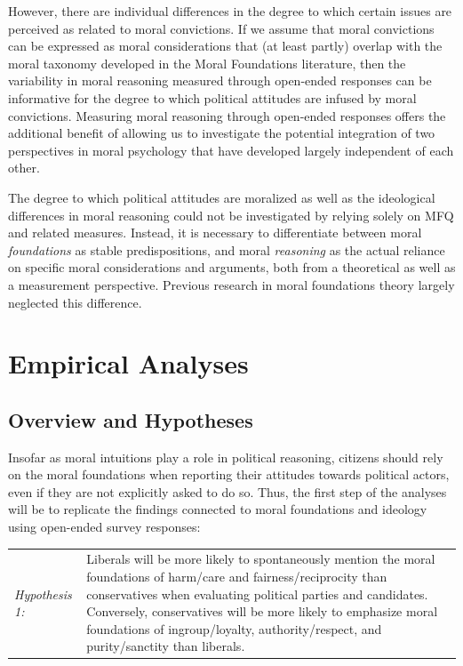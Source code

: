 \documentclass[12pt]{article}
\begin{document}
However, there are individual differences in the degree to which certain issues are perceived as related to moral convictions. If we assume that moral convictions can be expressed as moral considerations that (at least partly) overlap with the moral taxonomy developed in the Moral Foundations literature, then the variability in moral reasoning measured through open-ended responses can be informative for the degree to which political attitudes are infused by moral convictions. Measuring moral reasoning through open-ended responses offers the additional benefit of allowing us to investigate the potential integration of two perspectives in moral psychology that have developed largely independent of each other.

The degree to which political attitudes are moralized as well as the ideological differences in moral reasoning could not be investigated by relying solely on MFQ and related measures. Instead, it is necessary to differentiate between moral \textit{foundations} as stable predispositions, and moral \textit{reasoning} as the actual reliance on specific moral considerations and arguments, both from a theoretical as well as a measurement perspective. Previous research in moral foundations theory largely neglected this difference.



\section{Empirical Analyses}

\subsection{Overview and Hypotheses}

Insofar as moral intuitions play a role in political reasoning, citizens should rely on the moral foundations when reporting their attitudes towards political actors, even if they are not explicitly asked to do so. Thus, the first step of the analyses will be to replicate the findings connected to moral foundations and ideology using open-ended survey responses:

\vspace{0.3cm}
\begin{tabular}{lp{12cm}}
\textsl{Hypothesis 1:} & Liberals will be more likely to spontaneously mention the moral foundations of harm/care and fairness/reciprocity  than conservatives when evaluating political parties and candidates. Conversely, conservatives will be more likely to emphasize moral foundations of ingroup/loyalty, authority/respect, and purity/sanctity than liberals.
\end{tabular}
\vspace{0.5cm}
\end{document}
